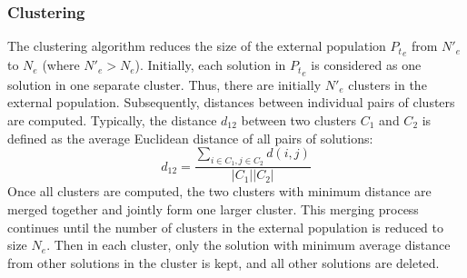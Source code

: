 \subsubsection{Clustering}\label{secClustering}
The clustering algorithm reduces the size of the external population ${P_t}_e$ from ${N'}_e$
to $N_e$ (where ${N'}_e > N_e$). Initially, each solution in ${P_t}_e$ is considered as one solution
in one separate cluster. Thus, there are initially ${N'}_e$ clusters in the external population.
Subsequently, distances between individual pairs of clusters are computed. Typically,
the distance $d_{12}$ between two clusters $C_1$ and $C_2$ is defined as the average
Euclidean distance of all pairs of solutions:
\begin{equation}
 d_{12} = \dfrac{\sum\limits_{i \in C_1 , j \in C_2} d(i,j) }{|C_1| |C_2|}
\end{equation}
Once all clusters are computed, the two clusters with minimum
distance are merged together and jointly form one larger cluster. This
merging process continues until the number of clusters in the external population is reduced
to size $N_e$. Then in each cluster, only the solution with minimum
average distance from other solutions in the cluster is kept, and all other solutions are
deleted.

